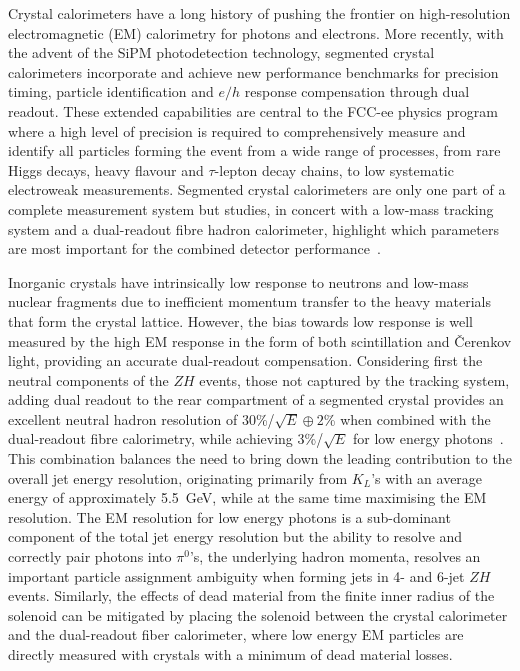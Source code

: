 Crystal calorimeters have a long history of pushing the frontier on high-resolution electromagnetic
(EM) calorimetry for photons and electrons.
More recently, with the advent of the SiPM photodetection technology, segmented crystal calorimeters incorporate and achieve new performance benchmarks for precision timing, particle identification and $e/h$ response compensation through dual readout.  These extended capabilities are central to the FCC-ee physics program where a high level of precision is required to comprehensively measure and identify all particles forming the event from a wide range of processes, from rare Higgs decays, heavy flavour and $\tau$-lepton decay chains, to low systematic electroweak measurements.  Segmented crystal calorimeters are only one part of a complete measurement system but studies, in concert with a low-mass tracking system and a dual-readout fibre hadron calorimeter, highlight which parameters are most important for the combined detector performance~\cite{Lucchini_2020}. 


Inorganic crystals have intrinsically low response to neutrons and low-mass nuclear fragments due to inefficient momentum transfer to the heavy materials that form the crystal lattice.  However, the bias towards low response is well measured by the high EM response in the form of both scintillation and \v{C}erenkov light, providing an accurate dual-readout compensation.
Considering first the neutral components of the $ZH$ events, those not captured by the tracking system, adding dual readout to the rear compartment of a segmented crystal provides an excellent neutral hadron resolution of 30\%/$\sqrt{E} \oplus 2$\% when combined with the dual-readout fibre calorimetry, while achieving 3\%/$\sqrt{E}$ for low energy photons~\cite{Lucchini_2020}.  This combination balances the need to bring down the leading contribution to the overall jet energy resolution, originating primarily from $K_L$'s with an average energy of approximately 5.5~GeV, while at the same time maximising the EM resolution.
The EM resolution for low energy photons is a sub-dominant component of the total jet energy resolution but the ability to resolve and correctly pair photons into $\pi^0$'s, the underlying hadron momenta, resolves an important particle assignment ambiguity when forming jets in 4- and 6-jet $ZH$ events.  Similarly, the effects of dead material from the finite inner radius of the solenoid can be mitigated by placing the solenoid between the crystal calorimeter and the dual-readout fiber calorimeter, where low energy EM particles are directly measured with crystals with a minimum of dead material losses.


